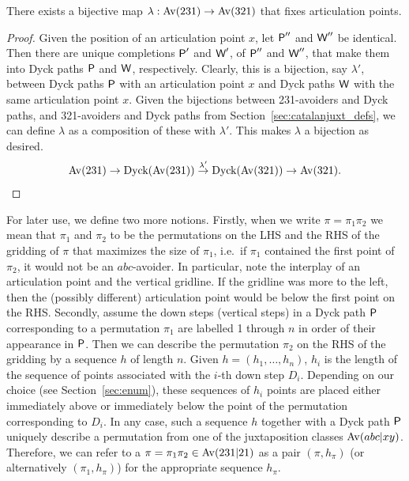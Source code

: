 \documentclass[12pt, a4paper, twoside]{report}
\begin{document}
\begin{lemma}
\label{lem:simplebijection}
There exists a bijective map $\lambda: \mathrm{Av}(231) \to \mathrm{Av}(321)$ that fixes articulation points.
\end{lemma}
\begin{proof}
Given the position of an articulation point $x$, let $\textsf{P}''$ and $\textsf{W}''$ be identical. Then there are unique completions $\textsf{P}'$ and $\textsf{W}'$, of $\textsf{P}''$ and $\textsf{W}''$, that make them into Dyck paths $\textsf{P}$ and $\textsf{W}$, respectively. Clearly, this is a bijection, say $\lambda'$, between Dyck paths $\textsf{P}$ with an articulation point $x$ and Dyck paths $\textsf{W}$ with the same articulation point $x$. Given the bijections between 231-avoiders and Dyck paths, and 321-avoiders and Dyck paths from Section~\ref{sec:catalanjuxt_defs}, we can define $\lambda$ as a composition of these with $\lambda'$. This makes $\lambda$ a bijection as desired.
\begin{align*}
\mathrm{Av}(231) \to \text{Dyck}(\mathrm{Av}(231)) \overset{\lambda'}{\to} \text{Dyck}(\mathrm{Av}(321))\to \mathrm{Av}(321).
\end{align*}
\end{proof}

For later use, we define two more notions. Firstly, when we write $\pi = \pi_1\pi_2$ we mean that $\pi_1$ and $\pi_2$ to be the permutations on the LHS and the RHS of the gridding of $\pi$ that maximizes the size of $\pi_1$, i.e.~if $\pi_1$ contained the first point of $\pi_2$, it would not be an $abc$-avoider. In particular, note the interplay of an articulation point and the vertical gridline. If the gridline was more to the left, then the (possibly different) articulation point would be below the first point on the RHS. Secondly, assume the down steps (vertical steps) in a Dyck path $\textsf{P}$ corresponding to a permutation $\pi_1$ are labelled 1 through $n$ in order of their appearance in $\textsf{P}$. Then we can describe the permutation $\pi_2$ on the RHS of the gridding by a sequence $h$ of length $n$. Given $h = (h_1,\ldots,h_n)$, $h_i$ is the length of the sequence of points associated with the $i$-th down step $D_i$. Depending on our choice (see Section~\ref{sec:enum}), these sequences of $h_i$ points are placed either immediately above or immediately below the point of the permutation corresponding to $D_i$. In any case, such a sequence $h$ together with a Dyck path $\textsf{P}$ uniquely describe a permutation from one of the juxtaposition classes $\mathrm{Av}(abc|xy)$. Therefore, we can refer to a $\pi = \pi_1\pi_2 \in \mathrm{Av}(231|21)$ as a pair $(\pi,h_\pi)$ (or alternatively $(\pi_1,h_\pi)$) for the appropriate sequence $h_\pi$.
\end{document}
